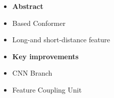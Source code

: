 \documentclass[CJK,aspectratio=169]{beamer}  %
\begin{document}
	\begin{frame}
		\begin{figure}
			\centering
			\begin{minipage}{.4\textwidth}
				\centering
				\small
				\begin{itemize} 
					\item \textbf{Abstract}
					
					\item[\checkmark]\small Based Conformer
					
					\item[\checkmark]\small Long-and short-distance feature
					
				\end{itemize}
				\begin{itemize} 
					\item \textbf{Key improvements}
					
					\item[\checkmark]\small CNN Branch
					
					
					\item[\checkmark]\small Feature Coupling Unit
					

\end{itemize}
\end{minipage}
\end{figure}
\end{frame}
\end{document}

